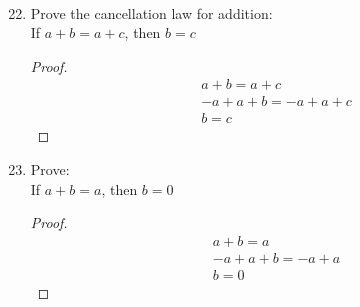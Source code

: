 \documentclass{article}
\begin{document}
\leavevmode \\
\begin{enumerate}
\setcounter{enumi}{21}
 \item Prove the cancellation law for addition:\\
 If $a + b = a + c$, then $b = c$
\begin{proof}
 \begin{align*}
	&a + b = a + c \\
	&-a + a + b = -a + a + c \\
	&b = c
 \end{align*}
\end{proof}
 \item Prove:\\
 If $a + b = a$, then $b = 0$
\begin{proof}
 \begin{align*}
	&a + b = a\\
	&-a + a + b = -a + a \\
	&b = 0
 \end{align*}
\end{proof}
\end{enumerate}
\newpage
\end{document}
